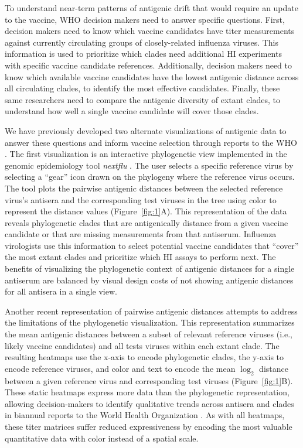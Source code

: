 \documentclass[utf8]{FrontiersinHarvard} %
\begin{document}
To understand near-term patterns of antigenic drift that would require an update to the vaccine, WHO decision makers need to answer specific questions.
First, decision makers need to know which vaccine candidates have titer measurements against currently circulating groups of closely-related influenza viruses.
This information is used to prioritize which clades need additional HI experiments with specific vaccine candidate references.
Additionally, decision makers need to know which available vaccine candidates have the lowest antigenic distance across all circulating clades, to identify the most effective candidates.
Finally, these same researchers need to compare the antigenic diversity of extant clades, to understand how well a single vaccine candidate will cover those clades.

We have previously developed two alternate visualizations of antigenic data to answer these questions and inform vaccine selection through reports to the WHO \citep{BedfordWHO2018,BedfordWHO2019}.
The first visualization is an interactive phylogenetic view implemented in the genomic epidemiology tool \emph{nextflu} \citep{NeherBedford2015,NeherBedford2018}.
The user selects a specific reference virus by selecting a ``gear'' icon drawn on the phylogeny where the reference virus occurs.
The tool plots the pairwise antigenic distances between the selected reference virus's antisera and the corresponding test viruses in the tree using color to represent the distance values (Figure~\ref{fig:1}A).
This representation of the data reveals phylogenetic clades that are antigenically distance from a given vaccine candidate or that are missing measurements from that antiserum.
Influenza virologists use this information to select potential vaccine candidates that ``cover'' the most extant clades and prioritize which HI assays to perform next.
The benefits of visualizing the phylogenetic context of antigenic distances for a single antiserum are balanced by visual design costs of not showing antigenic distances for all antisera in a single view.

Another recent representation of pairwise antigenic distances attempts to address the limitations of the phylogenetic visualization.
This representation summarizes the mean antigenic distances between a subset of relevant reference viruses (i.e., likely vaccine candidates) and all tests viruses within each extant clade.
The resulting heatmaps use the x-axis to encode phylogenetic clades, the y-axis to encode reference viruses, and color and text to encode the mean $\log_{2}$ distance between a given reference virus and corresponding test viruses (Figure~\ref{fig:1}B).
These static heatmaps express more data than the phylogenetic representation, allowing decision-makers to identify qualitative trends across antisera and clades in biannual reports to the World Health Organization .
As with all heatmaps, these titer matrices suffer reduced expressiveness by encoding the most valuable quantitative data with color instead of a spatial scale.
\end{document}
